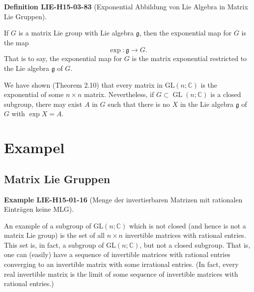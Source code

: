 \documentclass[10pt, letterpaper]{article}
\newcommand{\CustomHeading}[3]{%
  \par\medskip\noindent%
  \textbf{#1 #2} \textnormal{(#3)}.\enskip%
}
\newenvironment{DEF}[2]{\CustomHeading{Definition}{#1}{#2}}{}
\newenvironment{EXA}[2]{\CustomHeading{Example}{#1}{#2}}{}
\begin{document}
\begin{DEF}{LIE-H15-03-83}{Exponential Abbildung von Lie Algebra in Matrix Lie Gruppen}
If $G$ is a matrix Lie group with Lie algebra $\mathfrak{g}$, then the exponential map for $G$ is the map
$$
\exp : \mathfrak{g} \rightarrow G .
$$
That is to say, the exponential map for $G$ is the matrix exponential restricted to the Lie algebra $\mathfrak{g}$ of $G$. 

We have shown (Theorem 2.10) that every matrix in $\mathrm{GL}(n ; \mathbb{C})$ is the exponential of some $n \times n$ matrix. Nevertheless, if $G \subset \operatorname{GL}(n ; \mathbb{C})$ is a closed subgroup, there may exist $A$ in $G$ such that there is no $X$ in the Lie algebra $\mathfrak{g}$ of $G$ with $\exp X=A$.
\end{DEF}

\section{Exampel}

\subsection{Matrix Lie Gruppen}

\begin{EXA}{LIE-H15-01-16}{Menge der invertierbaren Matrizen mit rationalen Einträgen keine MLG}
An example of a subgroup of $\mathrm{GL}(n ; \mathbb{C})$ which is not closed (and hence is not a matrix Lie group) is the set of all $n \times n$ invertible matrices with rational entries. This set is, in fact, a subgroup of $\mathrm{GL}(n ; \mathbb{C})$, but not a closed subgroup. That is, one can (easily) have a sequence of invertible matrices with rational entries converging to an invertible matrix with some irrational entries. (In fact, every real invertible matrix is the limit of some sequence of invertible matrices with rational entries.)
\end{EXA}
\end{document}
